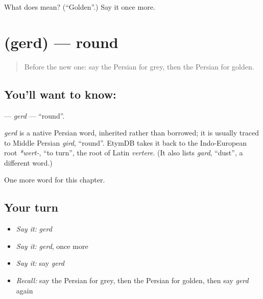 \begin{tcolorbox}[breakable,colback=teal!4,colframe=teal!35!black,title={Before you move on}]
What does  mean? (\textquotedblleft{}Golden\textquotedblright{}.) Say it once more.
\end{tcolorbox}
\section[\texorpdfstring{\fa{گرد} (gerd)}{گرد (gerd)}]{ (gerd) — round}

\label{lesson:FA-C128-gerd}



\begin{quote}
Before the new one: say the Persian for grey, then the Persian for golden.
\end{quote}

\subsection*{You'll want to know: }
\textbf{} — \emph{gerd} — \textquotedblleft{}round\textquotedblright{}.

\begin{cousinweb}
\emph{gerd} is a native Persian word, inherited rather than borrowed; it is usually traced to Middle Persian \emph{gird}, \textquotedblleft{}round\textquotedblright{}. EtymDB takes it back to the Indo-European root \emph{*wert-}, \textquotedblleft{}to turn\textquotedblright{}, the root of Latin \emph{vertere}. (It also lists \emph{gard}, \textquotedblleft{}dust\textquotedblright{}, a different word.)
\end{cousinweb}

\begin{grammarlens}[title={What you've built}]
One more word for this chapter.
\end{grammarlens}

\subsection*{Your turn}
\begin{itemize}
\raggedright
  \item \emph{Say it:} \emph{gerd}
  \item \emph{Say it:} \emph{gerd}, once more
  \item \emph{Say it:} say \emph{gerd}
  \item \emph{Recall:} say the Persian for grey, then the Persian for golden, then say \emph{gerd} again
\end{itemize}

